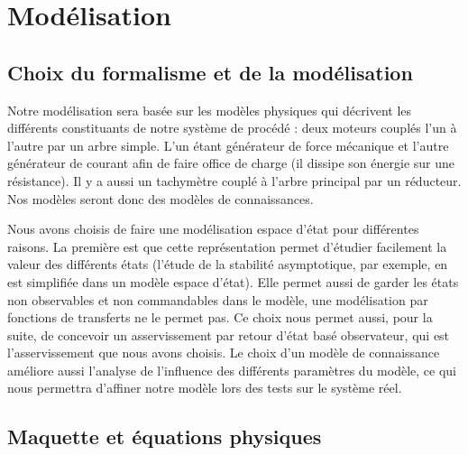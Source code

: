 \chapter{Modélisation}
\label{chap:modelisation}

\section{Choix du formalisme et de la modélisation}
Notre modélisation sera basée sur les modèles physiques qui décrivent les différents constituants de notre système de procédé : deux moteurs couplés l'un à l'autre par un arbre simple. L'un étant générateur de force mécanique et l'autre générateur de courant afin de faire office de charge (il dissipe son énergie sur une résistance). Il y a aussi un tachymètre couplé à l'arbre principal par un réducteur.
Nos modèles seront donc des modèles de connaissances.

Nous avons choisis de faire une modélisation espace d'état pour différentes raisons. La première est que cette représentation permet d'étudier facilement la valeur des différents états (l'étude de la stabilité asymptotique, par exemple, en est simplifiée dans un modèle espace d'état). Elle permet aussi de garder les états non observables et non commandables dans le modèle, une modélisation par fonctions de transferts ne le permet pas. Ce choix nous permet aussi, pour la suite, de concevoir un asservissement par retour d'état basé observateur, qui est l'asservissement que nous avons choisis. Le choix d'un modèle de connaissance améliore aussi l'analyse de l'influence des différents paramètres du modèle, ce qui nous permettra d'affiner notre modèle lors des tests sur le système réel. 



\section{Maquette et équations physiques}
